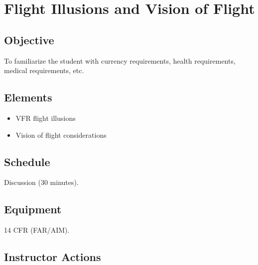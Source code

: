 \chapter{Flight Illusions and Vision of Flight}

\section{Objective}

To familiarize the student with currency requirements, health requirements, medical requirements, etc.

\section{Elements}

\begin{itemize}
  \item VFR flight illusions
  \item Vision of flight considerations
\end{itemize}

\section{Schedule}

Discussion (30 minutes).

\section{Equipment}

14 CFR (FAR/AIM).

\section{Instructor Actions}

